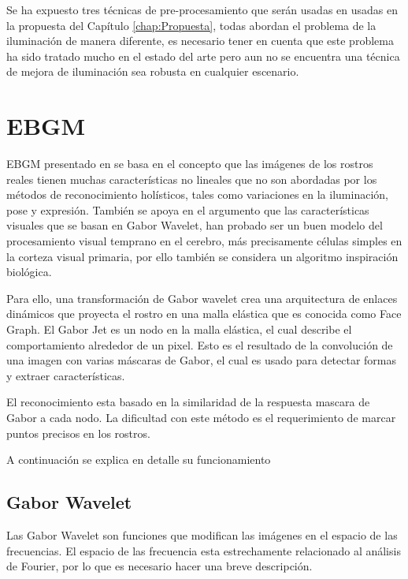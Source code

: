 Se ha expuesto tres técnicas de pre-procesamiento que serán usadas en usadas en la propuesta del Capítulo \ref{chap:Propuesta}, todas abordan el problema de la iluminación de manera diferente, es necesario tener en cuenta que este problema ha sido tratado mucho en el estado del arte pero aun no se encuentra una técnica de mejora de iluminación sea robusta en cualquier escenario.



\section{\acf{EBGM}}\label{scc::EBGM}

\ac{EBGM} presentado en \cite{wiskott1997face} se basa en el concepto que las imágenes de los rostros reales tienen muchas características no lineales que no son abordadas por los métodos de reconocimiento holísticos, tales como variaciones en la iluminación, pose y expresión.
También se apoya en el argumento que las características visuales que se basan en Gabor Wavelet, han probado ser un buen modelo del procesamiento visual temprano en el cerebro, más precisamente células simples en la corteza visual primaria, por ello también se considera un algoritmo inspiración biológica.

Para ello, una transformación de Gabor wavelet crea una arquitectura de enlaces dinámicos que proyecta el rostro en una malla elástica que es conocida como Face Graph.
El Gabor Jet es un nodo en la malla elástica, el cual describe el comportamiento alrededor de un pixel. Esto es el resultado de la convolución de una imagen con varias máscaras de Gabor, el cual es usado para detectar formas y extraer características.

El reconocimiento esta basado en la similaridad de la respuesta mascara de Gabor a cada nodo. La dificultad con este método es el requerimiento de marcar puntos precisos en los rostros.

A continuación se explica en detalle su funcionamiento

\subsection{Gabor Wavelet}\label{sscc:GaborWavelet}
Las Gabor Wavelet son funciones que modifican las imágenes en el espacio de las frecuencias. El espacio de las frecuencia esta estrechamente relacionado al análisis de Fourier, por lo que es necesario hacer una breve descripción.

